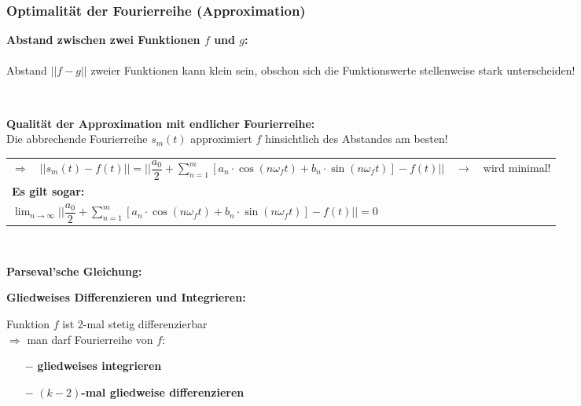 			\subsubsection{Optimalität der Fourierreihe (Approximation)}
				\begin{minipage}[b]{0.55\textwidth}
					\textbf{Abstand zwischen zwei Funktionen $f$ und $g$:}\\[3pt]
					\\[3pt]
					Abstand $||f - g||$ zweier Funktionen kann klein sein, obschon sich die Funktionswerte stellenweise stark unterscheiden!
				\end{minipage}
				\begin{minipage}[]{0.45\textwidth}
					\scalebox{0.8}{}\\[3pt]
				\end{minipage}
				\textbf{Qualität der Approximation mit endlicher Fourierreihe:}\\[3pt]
				Die abbrechende Fourierreihe $s_m(t)$ approximiert $f$ hinsichtlich des Abstandes am besten!\\[3pt]
				\begin{tabular}{|lll|}
					\hline
					$\Rightarrow \quad \displaystyle ||s_m(t) - f(t)|| = ||\dfrac{a_0}{2} + \sum\limits_{n=1}^{m} [a_n \cdot \cos(n \omega_f t) + b_n \cdot \sin(n \omega_f t)] - f(t)||$ & $\rightarrow$ & wird minimal!\\[3pt]
					\textbf{Es gilt sogar:} & &\\[3pt]
					$\displaystyle \lim_{n \to \infty} ||\dfrac{a_0}{2} + \sum\limits_{n=1}^{m} [a_n \cdot \cos(n \omega_f t) + b_n \cdot \sin(n \omega_f t)] - f(t)|| = 0$ & &\\[3pt]
					\hline
				\end{tabular}\\[3pt]
				\begin{minipage}[t]{0.5\textwidth}
					\textbf{Parseval’sche Gleichung:}\\[3pt]
				\end{minipage}
				\begin{minipage}[t]{0.5\textwidth}
					\textbf{Gliedweises Differenzieren und Integrieren:}
					\begin{framed}
						Funktion $f$ ist 2-mal stetig differenzierbar\\[3pt]
						$\Rightarrow$ man darf Fourierreihe von $f$:
						\begin{itemize}
							\item[$-$] \textbf{gliedweises integrieren}
							\item[$-$] \textbf{$(k-2)$-mal gliedweise differenzieren}
				 		\end{itemize}
					\end{framed}
				\end{minipage}
